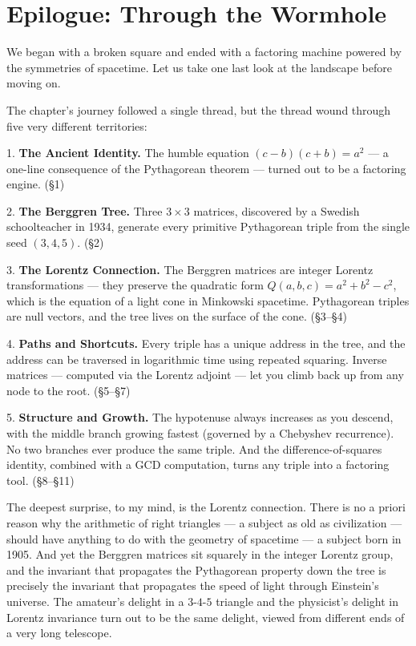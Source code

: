 \documentclass[11pt,openright,twoside]{book}
\theoremstyle{definition}
\begin{document}
\bigskip


\section{Epilogue: Through the Wormhole}

We began with a broken square and ended with a factoring machine powered by the symmetries of spacetime. Let us take one last look at the landscape before moving on.

The chapter's journey followed a single thread, but the thread wound through five very different territories:

1. \textbf{The Ancient Identity.} The humble equation $(c - b)(c + b) = a^2$ --- a one-line consequence of the Pythagorean theorem --- turned out to be a factoring engine. (§1)

2. \textbf{The Berggren Tree.} Three $3 \times 3$ matrices, discovered by a Swedish schoolteacher in 1934, generate every primitive Pythagorean triple from the single seed $(3, 4, 5)$. (§2)

3. \textbf{The Lorentz Connection.} The Berggren matrices are integer Lorentz transformations --- they preserve the quadratic form $Q(a, b, c) = a^2 + b^2 - c^2$, which is the equation of a light cone in Minkowski spacetime. Pythagorean triples are null vectors, and the tree lives on the surface of the cone. (§3--§4)

4. \textbf{Paths and Shortcuts.} Every triple has a unique address in the tree, and the address can be traversed in logarithmic time using repeated squaring. Inverse matrices --- computed via the Lorentz adjoint --- let you climb back up from any node to the root. (§5--§7)

5. \textbf{Structure and Growth.} The hypotenuse always increases as you descend, with the middle branch growing fastest (governed by a Chebyshev recurrence). No two branches ever produce the same triple. And the difference-of-squares identity, combined with a GCD computation, turns any triple into a factoring tool. (§8--§11)

The deepest surprise, to my mind, is the Lorentz connection. There is no a priori reason why the arithmetic of right triangles --- a subject as old as civilization --- should have anything to do with the geometry of spacetime --- a subject born in 1905. And yet the Berggren matrices sit squarely in the integer Lorentz group, and the invariant that propagates the Pythagorean property down the tree is precisely the invariant that propagates the speed of light through Einstein's universe. The amateur's delight in a $3$-$4$-$5$ triangle and the physicist's delight in Lorentz invariance turn out to be the same delight, viewed from different ends of a very long telescope.
\end{document}
